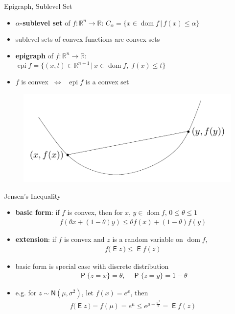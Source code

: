 \documentclass[10pt]{beamer}
\newcommand{\ds}{\displaystyle}
\newcommand{\ifff}{\;\Longleftrightarrow\;}
\DeclareMathOperator*{\dom}{dom}
\DeclareMathOperator*\prb{\mathsf{P}}
\DeclareMathOperator*\expc{\mathsf{E}}
\DeclareMathOperator*{\epi}{epi}
\theoremstyle{definition}
\begin{document}
\begin{frame}{Epigraph, Sublevel Set}
\begin{itemize}
  \item {\bf $\alpha$-sublevel set} of $f:\mathbb{R}^n\to\mathbb{R}$: $\ds C_\alpha = \{x\in\dom f\,|\, f(x)\leqslant\alpha\}$
  \item sublevel sets of convex functions are convex sets
  \item {\bf epigraph} of $f: \mathbb{R}^n\to\mathbb{R}$: \\ $\ds\epi f = \{(x, t)\in\mathbb{R}^{n+1}\,|\,x\in\dom f,\; f(x)\leqslant t\}$
  \item $f$ is convex $\ifff$ $\ds\epi f$ is a convex set
\end{itemize}
\begin{figure}[!htbp]
  \centering
  \includegraphics[scale=0.8,page=5]{fig/note06/03.pdf}
\end{figure}

\end{frame}

\begin{frame}{Jensen's Inequality}

\begin{itemize}
  \item {\bf basic form}: if $f$ is convex, then for $x$, $y\in\dom f$, $0\leqslant\theta\leqslant 1$
    \begin{align*}
      f(\theta x + (1 - \theta) y) \leqslant \theta f(x) + (1 - \theta) f(y)
    \end{align*}
  \item {\bf extension}: if $f$ is convex and $z$ is a random variable on $\dom f$,
    \begin{align*}
      f\big(\expc{z}\,\big) \leqslant \expc{f(z)}
    \end{align*}
  \item basic form is special case with discrete distribution
    \begin{align*}
      \prb\{z = x\} = \theta,\quad\prb\{z = y\} = 1 - \theta
    \end{align*}
  \item e.g. for $\ds z\sim\mathsf{N}(\mu,\sigma^2)$, let $\ds f(x) = e^x$, then
    \begin{align*}
      f\big(\expc{z}\,\big) = f(\mu) = e^{\mu}\leqslant e^{\mu + \frac{\sigma^2}{2}} = \expc{f(z)}
    \end{align*}
\end{itemize}

\end{frame}
\end{document}
